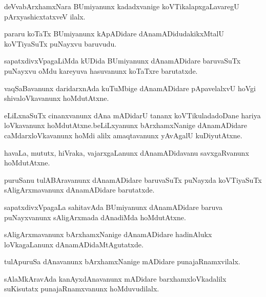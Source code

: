 \begin{mng}
deVvabArxhamxNara BUmiyanunx kadadxvanige koVTikalapxgaLavaregU pArxyashicxtatxveV ilalx.
\end{mng}

\begin{mng}
pararu koTaTx BUmiyanunx kApADidare dAnamADidudakikxMtalU koVTiyaSuTx puNayxvu baruvudu.
\end{mng}

\begin{mng}
sapatxdivxVpagaLiMda kUDida BUmiyanunx dAnamADidare baruvaSuTx puNayxvu oMdu kareyuva hasuvanunx koTaTxre barutatxde.
\end{mng}

\begin{mng}
vaqSaBavanunx daridarxnAda kuTuMbige dAnamADidare pApavelalxvU hoVgi shivaloVkavanunx hoMdutAtxne.
\end{mng}

\begin{mng}
eLiLxnaSuTx cinanxvanunx dAna mADidarU tananx koVTikuladadoDane hariya loVkavanunx hoMdutAtxne.beLiLxyanunx bArxhamxNanige dAnamADidare caMdarxloVkavanunx hoMdi alilx amaqtavanunx yAvAgalU kuDiyutAtxne.
\end{mng}

\begin{mng}
havaLa, mututx, hiVraka, vajarxgaLanunx dAnamADidavanu savxgaRvanunx hoMdutAtxne.
\end{mng}

\begin{mng}
puruSanu tulABAravanunx dAnamADidare baruvaSuTx puNayxda koVTiyaSuTx sAligArxmavanunx  dAnamADidare barutatxde.
\end{mng}

\begin{mng}
sapatxdivxVpagaLa sahitavAda BUmiyanunx dAnamADidare baruva puNayxvanunx sAligArxmada dAnadiMda hoMdutAtxne.
\end{mng}

\begin{mng}
sAligArxmavanunx bArxhamxNanige dAnamADidare hadinAlukx loVkagaLanunx dAnamADidaMtAgutatxde.
\end{mng}

\begin{mng}
tulApuruSa dAnavanunx bArxhamxNanige mADidare punajaRnamxvilalx.
\end{mng}

\begin{mng}
sAlaMkAravAda kanAyxdAnavanunx mADidare barxhamxloVkadalilx suKisutatx punajaRnamxvanunx hoMduvudilalx.
\end{mng}

